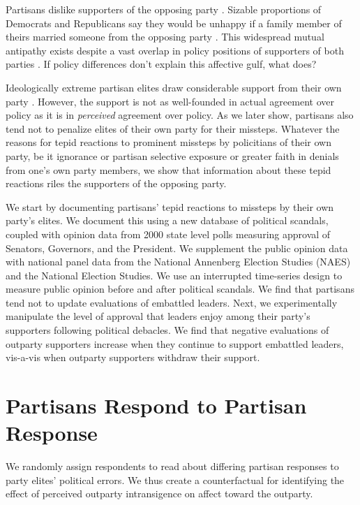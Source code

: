 Partisans dislike supporters of the opposing party \citep{iyengar2012,
iyengar2013}. Sizable proportions of Democrats and Republicans say they would be
unhappy if a family member of theirs married someone from the opposing party
\citep{iyengar2012}. This widespread mutual antipathy exists despite a vast overlap in policy positions of supporters of both parties \citep{fiorina2012}. If policy differences don't explain this affective gulf, what does?

Ideologically extreme partisan elites draw considerable support from their own
party \citep{sood2013}. However, the support is not as well-founded in actual
agreement over policy as it is in \textit{perceived} agreement over policy. As
we later show, partisans also tend not to penalize elites of their own party for
their missteps. Whatever the reasons for tepid reactions to prominent missteps
by policitians of their own party, be it ignorance or partisan
selective exposure or greater faith in denials from one's own party
members, we show that information about these tepid reactions riles the
supporters of the opposing party.

We start by documenting partisans' tepid reactions to missteps by their own
party's elites. We document this using a new database of political scandals, coupled with opinion data from 2000 state level polls measuring approval of Senators, Governors, and the President. We supplement the public opinion data with national panel data from the National Annenberg Election Studies (NAES) and the National Election Studies. We use an interrupted time-series design to measure public opinion before and after political scandals. We find that partisans tend not to update evaluations of embattled leaders. Next, we experimentally manipulate the level of approval that leaders enjoy among their party's supporters following political debacles. We find that negative evaluations of outparty supporters increase when they continue to support embattled leaders, vis-a-vis when outparty supporters withdraw their support.

\section*{Partisans Respond to Partisan Response}
We randomly assign respondents to read about differing partisan responses to party elites' political errors. We thus create a counterfactual for identifying the effect of perceived outparty intransigence on affect toward the outparty.

